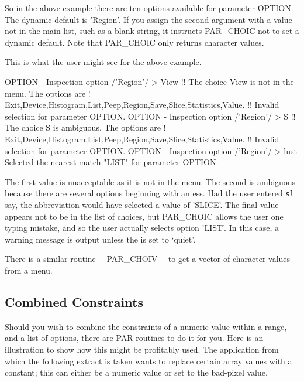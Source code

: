 \documentclass[twoside,11pt,nolof]{starlink}
\providecommand{\dash}{--}
\begin{document}
So in the above example there are ten options available for parameter
OPTION.  The dynamic default is 'Region'.  If you assign the second
argument with a value not in the main list, such as a blank string, it
instructs PAR\_CHOIC not to set a dynamic default. Note that
PAR\_CHOIC only returns character values.

This is what the user might see for the above example.
\begin{terminalv}
OPTION - Inspection option /'Region'/ > View
!! The choice View is not in the menu.  The options are
!     Exit,Device,Histogram,List,Peep,Region,Save,Slice,Statistics,Value.
!! Invalid selection for parameter OPTION.
OPTION - Inspection option /'Region'/ > S
!! The choice S is ambiguous.  The options are
!     Exit,Device,Histogram,List,Peep,Region,Save,Slice,Statistics,Value.
!! Invalid selection for parameter OPTION.
OPTION - Inspection option /'Region'/ > lust
Selected the nearest match "LIST" for parameter OPTION.
\end{terminalv}

The first value is unacceptable as it is not in the menu.  The second is
ambiguous because there are several options beginning with an ess. Had
the user entered \texttt{sl} say, the abbreviation would have selected a
value of 'SLICE'. The final value appears not to be in the list of
choices, but PAR\_CHOIC allows the user one typing mistake, and so the
user actually selects option 'LIST'. In this case, a warning message is output
unless the
 is set to `quiet'.

There is a similar routine \dash\ PAR\_CHOIV \dash\ to get a vector of character
values from a menu.

\subsection{Combined Constraints}

Should you wish to combine the constraints of a numeric value within a
range, and a list of options, there are PAR routines to do it for you.
Here is an illustration to show how this might be profitably used.  The
application from which the following extract is taken wants to replace
certain array values with a constant; this can either be a numeric value
or set to the bad-pixel value.
\end{document}
